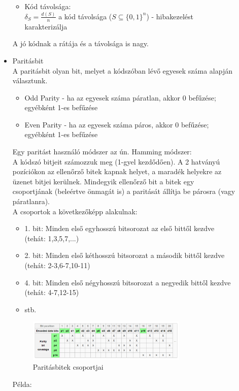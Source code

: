 \documentclass[margin=0px]{article}
\begin{document}
\begin{description}
\begin{itemize}
\begin{itemize}
							\item Kód távolsága: \\
								$\delta_S = \frac{d(S)}{n}$ a kód távolsága  ($S \subseteq \{0,1\}^n$) - hibakezelést karakterizálja
						\end{itemize}
						A jó kódnak a rátája és a távolsága is nagy.
					\item Paritásbit \\
						A paritásbit olyan bit, melyet a kódszóban lévő egyesek száma alapján választunk.
						\begin{itemize}
							\item Odd Parity - ha az egyesek száma páratlan, akkor 0 befűzése; egyébként 1-es befűzése
							\item Even Parity - ha az egyesek száma páros, akkor 0 befűzése; egyébként 1-es befűzése
						\end{itemize}
						Egy paritást használó módszer az ún. Hamming módszer:\\
						A kódszó bitjeit számozzuk meg (1-gyel kezdődően). A 2 hatványú pozíciókon az ellenőrző bitek kapnak helyet, a maradék helyekre az üzenet bitjei kerülnek. Mindegyik ellenőrző bit a bitek egy csoportjának (beleértve önmagát is) a paritását állítja be párosra (vagy páratlanra).\\
						A csoportok a következőképp alakulnak:
						\begin{itemize}
							\item 1. bit: Minden első egyhosszú bitsorozat az első bittől kezdve (tehát: 1,3,5,7,...)
							\item 2. bit: Minden első kéthosszú bitsorozat a második bittől kezdve (tehát: 2-3,6-7,10-11)
							\item 4. bit: Minden első négyhosszú bitsorozat a negyedik bittől kezdve (tehát: 4-7,12-15)
							\item stb.
						\end{itemize}
						\begin{figure}[H]
							\centering
							\includegraphics[width=0.8\textwidth]{img/paritasbit.png}
							\caption{Paritásbitek csoportjai}	
						\end{figure}
						Példa:\\

\end{itemize}
\end{description}
\end{document}
